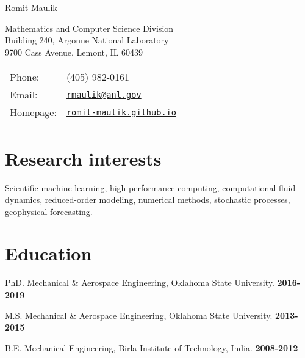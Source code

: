 \documentclass[letterpaper]{article}
\def\name{Romit Maulik}
\renewenvironment{itemize}{
  \begin{list}{}{
    \setlength{\leftmargin}{1.5em}
  }
}{
  \end{list}
}
\begin{document}
{\huge \name}


\vspace{0.25in}

\begin{minipage}{0.45\linewidth}
  Mathematics and Computer Science Division \\
  Building 240, Argonne National Laboratory \\
  9700 Cass Avenue, Lemont, IL 60439
\end{minipage}
\begin{minipage}{0.45\linewidth}
  \begin{tabular}{ll}
    Phone: & (405) 982-0161 \\
    Email: & \href{mailto:rmaulik@anl.gov}{\tt rmaulik@anl.gov} \\
    Homepage: & \href{https://romit-maulik.github.io/}{\tt romit-maulik.github.io} \\
  \end{tabular}
\end{minipage}

\section*{Research interests}

Scientific machine learning, high-performance computing, computational fluid dynamics, reduced-order modeling, numerical methods, stochastic processes, geophysical forecasting.

\section*{Education}

\begin{itemize}
  \item PhD. Mechanical \& Aerospace Engineering, Oklahoma State University. \hfill \textbf{2016-2019}
  \item M.S. Mechanical \& Aerospace Engineering, Oklahoma State University. \hfill \textbf{2013-2015}
  \item B.E. Mechanical Engineering, Birla Institute of Technology, India. \hfill \textbf{2008-2012}
\end{itemize}
\end{document}
